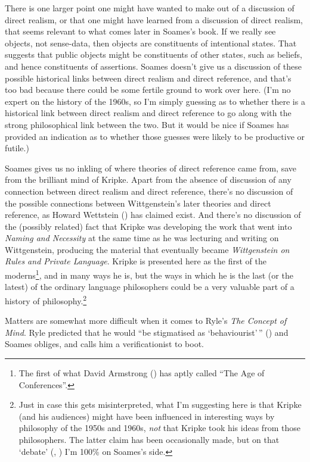 \documentclass[
  10pt,
  letterpaper,
  DIV=11,
  numbers=noendperiod,
  twoside]{scrartcl}
\begin{document}
There is one larger point one might have wanted to make out of a
discussion of direct realism, or that one might have learned from a
discussion of direct realism, that seems relevant to what comes later in
Soames's book. If we really see objects, not sense-data, then objects
are constituents of intentional states. That suggests that public
objects might be constituents of other states, such as beliefs, and
hence constituents of assertions. Soames doesn't give us a discussion of
these possible historical links between direct realism and direct
reference, and that's too bad because there could be some fertile ground
to work over here. (I'm no expert on the history of the 1960s, so I'm
simply guessing as to whether there is a historical link between direct
realism and direct reference to go along with the strong philosophical
link between the two. But it would be nice if Soames has provided an
indication as to whether those guesses were likely to be productive or
futile.)

Soames gives us no inkling of where theories of direct reference came
from, save from the brilliant mind of Kripke. Apart from the absence of
discussion of any connection between direct realism and direct
reference, there's no discussion of the possible connections between
Wittgenstein's later theories and direct reference, as Howard Wettstein
() has claimed exist. And there's no
discussion of the (possibly related) fact that Kripke was developing the
work that went into \emph{Naming and Necessity} at the same time as he
was lecturing and writing on Wittgenstein, producing the material that
eventually became \emph{Wittgenstein on Rules and Private Language}.
Kripke is presented here as the first of the moderns\footnote{The first
  of what David Armstrong () has aptly
  called ``The Age of Conferences''.}, and in many ways he is, but the
ways in which he is the last (or the latest) of the ordinary language
philosophers could be a very valuable part of a history of
philosophy.\footnote{Just in case this gets misinterpreted, what I'm
  suggesting here is that Kripke (and his audiences) might have been
  influenced in interesting ways by philosophy of the 1950s and 1960s,
  \emph{not} that Kripke took his ideas from those philosophers. The
  latter claim has been occasionally made, but on that `debate'
  (,
  ) I'm 100\% on Soames's side.}

Matters are somewhat more difficult when it comes to Ryle's \emph{The
Concept of Mind}. Ryle predicted that he would ``be stigmatised as
`behaviourist'\,'' () and Soames
obliges, and calls him a verificationist to boot.
\end{document}
